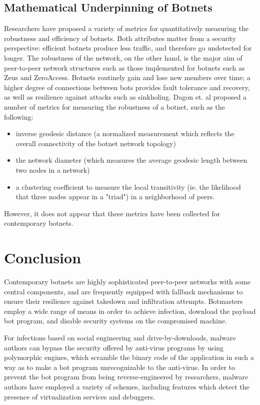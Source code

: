\documentclass{acm_proc_article-sp}
\begin{document}
\subsection{Mathematical Underpinning of Botnets}

Researchers have proposed a variety of metrics for quantitatively measuring the robustness and efficiency of botnets.  Both attributes matter from a security perspective: efficient botnets produce less traffic, and therefore go undetected for longer.  The robustness of the network, on the other hand, is the major aim of peer-to-peer network structures such as those implemented for botnets such as Zeus and ZeroAccess.  Botnets routinely gain and lose new members over time; a higher degree of connections between bots provides fault tolerance and recovery, as well as resilience against attacks such as sinkholing\cite{botnet:metrics}.  Dagon et. al proposed a number of metrics for measuring the robustness of a botnet, such as the following:

\begin{itemize}
\item inverse geodesic distance (a normalized measurement which reflects the overall connectivity of the botnet network topology)
\item the network diameter (which measures the average geodesic length between two nodes in a network)
\item a clustering coefficient to measure the local transitivity (ie. the likelihood that three nodes appear in a "triad") in a neighborhood of peers.
\end{itemize}

However, it does not appear that these metrics have been collected for contemporary botnets.

\section{Conclusion}

Contemporary botnets are highly sophisticated peer-to-peer networks with some central components, and are frequently equipped with fallback mechanisms to ensure their resilience against takedown and infiltration attempts.  Botmasters employ a wide range of means in order to achieve infection, download the payload bot program, and disable security systems on the compromised machine.

For infections based on social engineering and drive-by-downloads, malware authors can bypass the security offered by anti-virus programs by using polymorphic engines, which scramble the binary code of the application in such a way as to make a bot program unrecognizable to the anti-virus.  In order to prevent the bot program from being reverse-engineered by researchers, malware authors have employed a variety of schemes, including features which detect the presence of virtualization services and debuggers.
\end{document}
